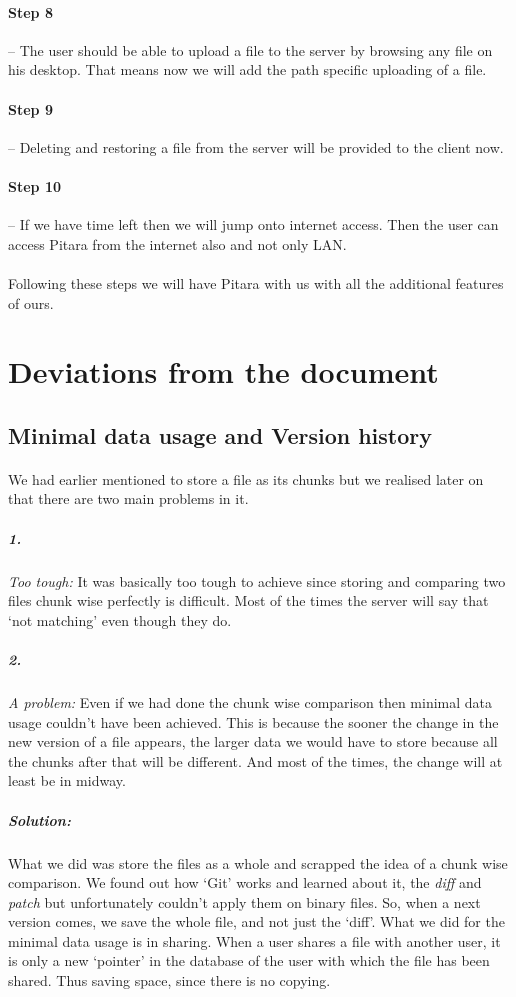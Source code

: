 \documentclass{article}
\begin{document}
\paragraph{Step 8}-- The user should be able to upload a file to the server by browsing any file on his desktop. That means now we will add the path specific uploading of a file.
\paragraph{Step 9}-- Deleting and restoring a file from the server will be provided to the client now.
\paragraph{Step 10}-- If we have time left then we will jump onto internet access. Then the user can access Pitara from the internet also and not only LAN.
\paragraph{} Following these steps we will have Pitara with us with all the additional features of ours.

\section{Deviations from the document}\label{devs}
	\subsection{Minimal data usage and Version history}
	\paragraph{}We had earlier mentioned to store a file as its chunks but we realised later on that there are two main problems in it.
	\subparagraph{1.} \emph{Too tough: }It was basically too tough to achieve since storing and comparing two files chunk wise perfectly is difficult. Most of the times the server will say that `not matching' even though they do. 
	\subparagraph{2.} \emph{A problem: } Even if we had done the chunk wise comparison then minimal data usage couldn't have been achieved. This is because the sooner the change in the new version of a file appears, the larger data we would have to store because all the chunks after that will be different. And most of the times, the change will at least be in midway.
	\subparagraph{Solution: }What we did was store the files as a whole and scrapped the idea of a chunk wise comparison. We found out how `Git' works and learned about it, the \emph{diff} and \emph{patch} but unfortunately couldn't apply them on binary files. So, when a next version comes, we save the whole file, and not just the `diff'. What we did for the minimal data usage is in sharing. When a user shares a file with another user, it is only a new `pointer' in the database of the user with which the file has been shared. Thus saving space, since there is no copying.
\end{document}
